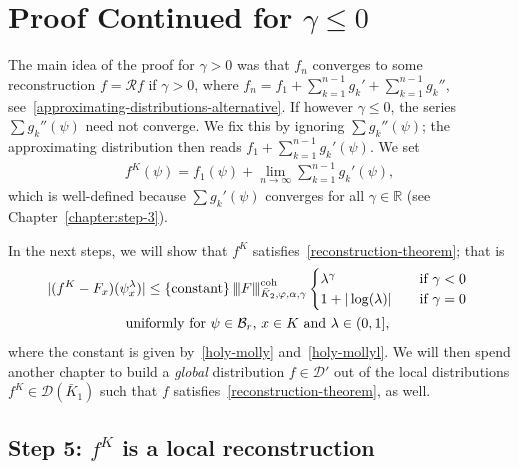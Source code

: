


\chapter{Proof Continued for \texorpdfstring{\(\gamma \leq 0\)}{gamma <= 0}}\label{chapter:proof-gamma-negative}

The main idea of the proof for \(\gamma > 0\) was that \(f_n\) converges to some reconstruction \(f = \mathcal{R}f\) if \(\gamma > 0\), where \(f_n = f_1 + \sum\limits^{n-1}_{k=1} g_k'  + \sum\limits^{n-1}_{k=1} g_k''\), see~\eqref{approximating-distributions-alternative}.   
If however \(\gamma \leq 0\), the series \(\sum g_k''(\psi)\) need not converge. We fix this by ignoring \(\sum g_k''(\psi)\); the approximating distribution then reads \(f_1 + \sum\limits^{n-1}_{k=1} g_k'(\psi)\). We set 
\begin{align*}
    f^K(\psi) = f_1(\psi) + \lim_{n\to \infty}\sum^{n-1}_{k=1} g_k'(\psi),
\end{align*}
which is well-defined because \(\sum g_k'(\psi)\) converges for all \(\gamma \in \mathbb{R}\) (see Chapter~\ref{chapter:step-3}).

In the next steps, we will show that \(f^K\) satisfies~\eqref{reconstruction-theorem}; that is
\begin{gather*}
    |(f^K - F_x)(\psi_x^\lambda)| \leq \left\{ \mathrm{constant} \right\} {\left\vert\kern-0.25ex\left\vert\kern-0.25ex\left\vert F \right\vert\kern-0.25ex\right\vert\kern-0.25ex\right\vert}^{\mathrm{coh}}_{\bar K_{2},\varphi,\alpha,\gamma} \begin{cases}
        \lambda^\gamma  &\text{if \(\gamma < 0\)}\\
        1 + |\log(\lambda)| \quad &\text{if \(\gamma = 0\) } 
    \end{cases}
    \\
    \text{uniformly for \(\psi \in \mathcal{B}_r\), \(x \in K\) and \(\lambda \in(0,1]\),   }
\end{gather*}
where the constant is given by~\eqref{holy-molly} and~\eqref{holy-mollyl}. We will then spend another chapter to build a \emph{global} distribution \(f \in \mathcal{D}'\) out of the local distributions \(f^K \in \mathcal{D}(\bar K_1)\) such that \(f\) satisfies~\eqref{reconstruction-theorem}, as well.

\section{Step 5: \texorpdfstring{\(f^K\) is a local reconstruction}{fK is a local reconstruction}}
 

